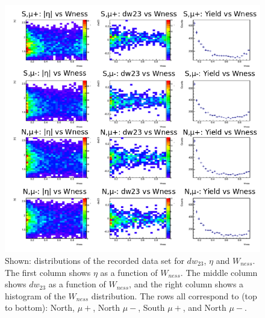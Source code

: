 \begin{figure}[ht]
  \centering
  \includegraphics[width=\linewidth]{./figures/dw23_vs_wness_data.png}
  \caption{
    Shown: distributions of the recorded data set for $dw_{23}$, $\eta$ and
    $W_{ness}$.  The first column shows $\eta$ as a function of $W_{ness}$. The
    middle column shows $dw_{23}$ as a function of $W_{ness}$, and the right
    column shows a histogram of the $W_{ness}$ distribution. The rows all
    correspond to (top to bottom): North, $\mu+$, North $\mu-$, South $\mu+$,
    and North $\mu-$.
  }
  \label{fig:dw23_eta_wness_dat}
\end{figure}


